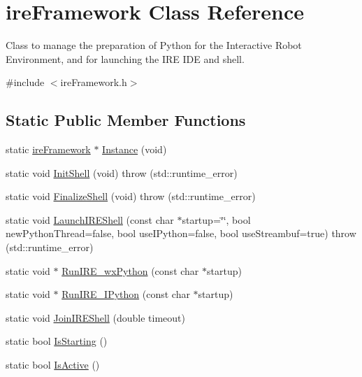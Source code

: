 \hypertarget{classire_framework}{}\section{ire\+Framework Class Reference}
\label{classire_framework}


Class to manage the preparation of Python for the Interactive Robot Environment, and for launching the I\+R\+E I\+D\+E and shell.  




{\ttfamily \#include $<$ire\+Framework.\+h$>$}

\subsection*{Static Public Member Functions}
\begin{DoxyCompactItemize}
\item 
static \hyperlink{classire_framework}{ire\+Framework} $\ast$ \hyperlink{classire_framework_a7837e9abe5dc13a4d7c0e817f0f926e8}{Instance} (void)
\item 
static void \hyperlink{classire_framework_aca291a20c2f723f18ad82eb14fb9825e}{Init\+Shell} (void)  throw (std\+::runtime\+\_\+error)
\item 
static void \hyperlink{classire_framework_ab169db7d19be341488c4297ff7f75152}{Finalize\+Shell} (void)  throw (std\+::runtime\+\_\+error)
\item 
static void \hyperlink{classire_framework_a5d86bd34ba4afc41dcca790fed6becfc}{Launch\+I\+R\+E\+Shell} (const char $\ast$startup=\char`\"{}\char`\"{}, bool new\+Python\+Thread=false, bool use\+I\+Python=false, bool use\+Streambuf=true)  throw (std\+::runtime\+\_\+error)
\item 
static void $\ast$ \hyperlink{classire_framework_a36bb4fb2474b82d92ee0044da5113dde}{Run\+I\+R\+E\+\_\+wx\+Python} (const char $\ast$startup)
\item 
static void $\ast$ \hyperlink{classire_framework_ae812e959980c7ab3e7d72e0439f18833}{Run\+I\+R\+E\+\_\+\+I\+Python} (const char $\ast$startup)
\item 
static void \hyperlink{classire_framework_a272dfb38dadc652b543493a608061399}{Join\+I\+R\+E\+Shell} (double timeout)
\item 
static bool \hyperlink{classire_framework_a05c01077622e8377c87b8d2e60e4add6}{Is\+Starting} ()
\item 
static bool \hyperlink{classire_framework_a9f202e6d71fc142a9d22a479ce52748c}{Is\+Active} ()

\end{DoxyCompactItemize}
